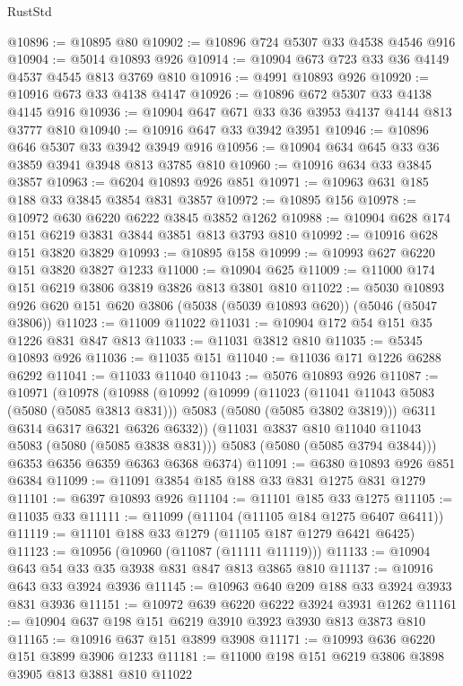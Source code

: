 \begin{lexlean}{RustStd}
\begin{coremodule}
@10896 := @10895 @80
@10902 := @10896 @724 @5307 @33 @4538 @4546 @916
@10904 := @5014 @10893 @926
@10914 := @10904 @673 @723 @33 @36 @4149 @4537 @4545 @813 @3769 @810
@10916 := @4991 @10893 @926
@10920 := @10916 @673 @33 @4138 @4147
@10926 := @10896 @672 @5307 @33 @4138 @4145 @916
@10936 := @10904 @647 @671 @33 @36 @3953 @4137 @4144 @813 @3777 @810
@10940 := @10916 @647 @33 @3942 @3951
@10946 := @10896 @646 @5307 @33 @3942 @3949 @916
@10956 := @10904 @634 @645 @33 @36 @3859 @3941 @3948 @813 @3785 @810
@10960 := @10916 @634 @33 @3845 @3857
@10963 := @6204 @10893 @926 @851
@10971 := @10963 @631 @185 @188 @33 @3845 @3854 @831 @3857
@10972 := @10895 @156
@10978 := @10972 @630 @6220 @6222 @3845 @3852 @1262
@10988 := @10904 @628 @174 @151 @6219 @3831 @3844 @3851 @813 @3793 @810
@10992 := @10916 @628 @151 @3820 @3829
@10993 := @10895 @158
@10999 := @10993 @627 @6220 @151 @3820 @3827 @1233
@11000 := @10904 @625
@11009 := @11000 @174 @151 @6219 @3806 @3819 @3826 @813 @3801 @810
@11022 := @5030 @10893 @926 @620 @151 @620 @3806 (@5038 (@5039 @10893 @620)) (@5046 (@5047 @3806))
@11023 := @11009 @11022
@11031 := @10904 @172 @54 @151 @35 @1226 @831 @847 @813
@11033 := @11031 @3812 @810
@11035 := @5345 @10893 @926
@11036 := @11035 @151
@11040 := @11036 @171 @1226 @6288 @6292
@11041 := @11033 @11040
@11043 := @5076 @10893 @926
@11087 := @10971
    (@10978
      (@10988
        (@10992
          (@10999
            (@11023
              (@11041 @11043 @5083 (@5080 (@5085 @3813 @831)))
              @5083
              (@5080 (@5085 @3802 @3819)))
            @6311
            @6314
            @6317
            @6321
            @6326
            @6332))
        (@11031 @3837 @810 @11040 @11043 @5083 (@5080 (@5085 @3838 @831)))
        @5083
        (@5080 (@5085 @3794 @3844)))
      @6353
      @6356
      @6359
      @6363
      @6368
      @6374)
@11091 := @6380 @10893 @926 @851 @6384
@11099 := @11091 @3854 @185 @188 @33 @831 @1275 @831 @1279
@11101 := @6397 @10893 @926
@11104 := @11101 @185 @33 @1275
@11105 := @11035 @33
@11111 := @11099 (@11104 (@11105 @184 @1275 @6407 @6411))
@11119 := @11101 @188 @33 @1279 (@11105 @187 @1279 @6421 @6425)
@11123 := @10956 (@10960 (@11087 (@11111 @11119)))
@11133 := @10904 @643 @54 @33 @35 @3938 @831 @847 @813 @3865 @810
@11137 := @10916 @643 @33 @3924 @3936
@11145 := @10963 @640 @209 @188 @33 @3924 @3933 @831 @3936
@11151 := @10972 @639 @6220 @6222 @3924 @3931 @1262
@11161 := @10904 @637 @198 @151 @6219 @3910 @3923 @3930 @813 @3873 @810
@11165 := @10916 @637 @151 @3899 @3908
@11171 := @10993 @636 @6220 @151 @3899 @3906 @1233
@11181 := @11000 @198 @151 @6219 @3806 @3898 @3905 @813 @3881 @810 @11022

\end{coremodule}
\end{lexlean}
